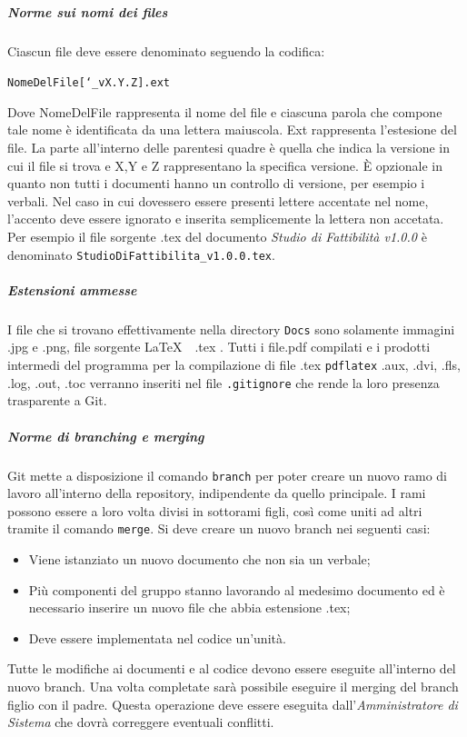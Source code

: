 			\subparagraph{Norme sui nomi dei files} \Spazio
			Ciascun file deve essere denominato seguendo la codifica:
					
					\begin{center}
						\texttt{NomeDelFile[\char`_vX.Y.Z].ext}
					\end{center}
			Dove NomeDelFile rappresenta il nome del file e ciascuna parola che compone tale nome è identificata da una lettera maiuscola. Ext rappresenta l'estesione del file. La parte all'interno delle parentesi quadre è quella che indica la versione in cui il file si trova e X,Y e Z rappresentano la specifica versione. È opzionale in quanto non tutti i documenti hanno un controllo di versione, per esempio i verbali. Nel caso in cui dovessero essere presenti lettere accentate nel nome, l'accento deve essere ignorato e inserita semplicemente la lettera non accetata. Per esempio il file sorgente .tex del documento \emph{Studio di Fattibilità v1.0.0} è denominato \texttt{StudioDiFattibilita\_v1.0.0.tex}.
			
			\subparagraph{Estensioni ammesse} \Spazio
			I file che si trovano effettivamente nella directory \texttt{Docs} sono solamente immagini .jpg e .png, file sorgente \LaTeX $\text{ }$ .tex . Tutti i file.pdf compilati e i prodotti intermedi del programma per la compilazione di file .tex \texttt{pdflatex} .aux, .dvi, .fls, .log, .out, .toc verranno inseriti nel file \texttt{.gitignore} che rende la loro presenza trasparente a Git.
			
			\subparagraph{Norme di branching e merging} \Spazio
			Git mette a disposizione il comando \texttt{branch} per poter creare un nuovo ramo di lavoro all'interno della repository, indipendente da quello principale. I rami possono essere a loro volta divisi in sottorami figli, così come uniti ad altri tramite il comando \texttt{merge}. Si deve creare un nuovo branch nei seguenti casi:
			\begin{itemize}
				\item Viene istanziato un nuovo documento che non sia un verbale;
				\item Più componenti del gruppo stanno lavorando al medesimo documento ed è necessario inserire un nuovo file che abbia estensione .tex;
				\item Deve essere implementata nel codice un'unità.
			\end{itemize}
			Tutte le modifiche ai documenti e al codice devono essere eseguite all'interno del nuovo branch. Una volta completate sarà possibile eseguire il merging del branch figlio con il padre. Questa operazione deve essere eseguita dall'\emph{Amministratore di Sistema} che dovrà correggere eventuali conflitti.
			
